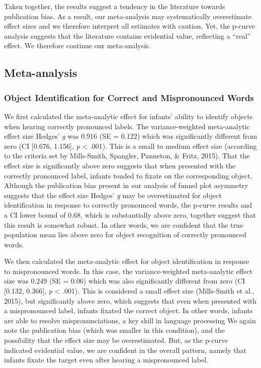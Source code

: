 \documentclass[man]{apa6}
\begin{document}
Taken together, the results suggest a tendency in the literature towards publication bias. As a result, our meta-analysis may systematically overestimate effect sizes and we therefore interpret all estimates with caution. Yet, the p-curve analysis suggests that the literature contains evidential value, reflecting a \enquote{real} effect. We therefore continue our meta-analysis.

\hypertarget{meta-analysis-1}{%
\subsection{Meta-analysis}\label{meta-analysis-1}}

\hypertarget{object-identification-for-correct-and-mispronounced-words}{%
\subsubsection{Object Identification for Correct and Mispronounced Words}\label{object-identification-for-correct-and-mispronounced-words}}

We first calculated the meta-analytic effect for infants' ability to identify objects when hearing correctly pronounced labels. The variance-weighted meta-analytic effect size Hedges' \emph{g} was 0.916 (SE = 0.122) which was significantly different from zero (CI {[}0.676, 1.156{]}, \emph{p} \textless{} .001). This is a small to medium effect size (according to the criteria set by Mills-Smith, Spangler, Panneton, \& Fritz, 2015). That the effect size is significantly above zero suggests that when presented with the correctly pronounced label, infants tended to fixate on the corresponding object. Although the publication bias present in our analysis of funnel plot asymmetry suggests that the effect size Hedges' \emph{g} may be overestimated for object identification in response to correctly pronounced words, the p-curve results and a CI lower bound of 0.68, which is substantially above zero, together suggest that this result is somewhat robust. In other words, we are confident that the true population mean lies above zero for object recognition of correctly pronounced words.

We then calculated the meta-analytic effect for object identification in response to mispronounced words. In this case, the variance-weighted meta-analytic effect size was 0.249 (SE = 0.06) which was also significantly different from zero (CI {[}0.132, 0.366{]}, \emph{p} \textless{} .001). This is considered a small effect size (Mills-Smith et al., 2015), but significantly above zero, which suggests that even when presented with a mispronounced label, infants fixated the correct object. In other words, infants are able to resolve mispronunciations, a key skill in language processing We again note the publication bias (which was smaller in this condition), and the possibility that the effect size may be overestimated. But, as the p-curve indicated evidential value, we are confident in the overall pattern, namely that infants fixate the target even after hearing a mispronounced label.
\end{document}
